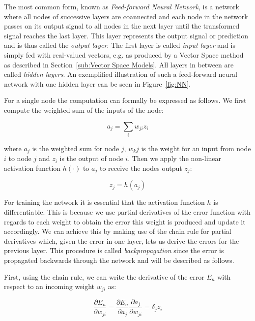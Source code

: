 The most common form, known as \emph{Feed-forward Neural Network}, is a network where all nodes of successive layers are coannected and each node in the network passes on its output signal to all nodes in the next layer until the transformed signal reaches the last layer. This layer represents the output signal or prediction and is thus called the \emph{output layer}. The first layer is called \emph{input layer} and is simply fed with real-valued vectors, e.g. as produced by a Vector Space method as described in Section~\ref{sub:Vector Space Models}. All layers in between are called \emph{hidden layers}. An exemplified illustration of such a feed-forward neural network with one hidden layer can be seen in Figure~\ref{fig:NN}.

For a single node the computation can formally be expressed as follows. We first compute the weighted sum of the inputs of the node:

\begin{equation}
  a_j = \sum_i w_{ji} z_i
  \label{eq:ann weighted sum}
\end{equation}

where $a_j$ is the weighted sum for node $j$, $w_kj$ is the weight for an input from node $i$ to node $j$ and $z_i$ is the output of node $i$. Then we apply the non-linear activation function $h(\cdot)$ to $a_j$ to receive the nodes output $z_j$:

\begin{equation}
  z_j = h(a_j)
  \label{eq:ann activation}
\end{equation}

For training the network it is essential that the activation function $h$ is differentiable. This is because we use partial derivatives of the error function with regards to each weight to obtain the error this weight is produced and update it accordingly. We can achieve this by making use of the chain rule for partial derivatives which, given the error in one layer, lets us derive the errors for the previous layer. This procedure is called \emph{backpropagation} since the error is propagated backwards through the network and will be described as follows.

First, using the chain rule, we can write the derivative of the error $E_n$ with respect to an incoming weight $w_{ji}$ as:

\begin{equation}
	\frac{\partial E_n}{\partial w_{ji}} = \frac{\partial E_n}{\partial a_j} \frac{\partial a_j}{\partial w_{ji}} = \delta_j z_i
	\label{eq:ann derivatives}
\end{equation}

